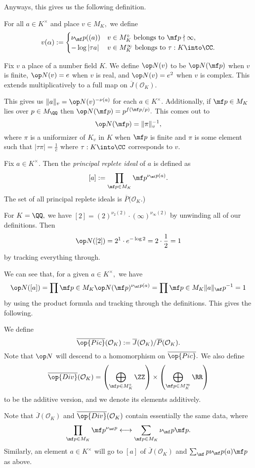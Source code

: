 Anyways, this gives us the following definition.
\begin{definition}
	For all $a\in K^\times$ and place $v\in M_K,$ we define
	\[v(\alpha):=\begin{cases}
		\nu_\mf p((a)) & v\in M_K^\circ\text{ belongs to }\mf p\nmid\infty, \\
		-\log|\tau a| & v\in M_K^\infty\text{ belongs to }\tau:K\into\CC.
	\end{cases}\]
\end{definition}
\begin{definition}
	Fix $v$ a place of a number field $K.$ We define $\op N(v)$ to be $\op N(\mf p)$ when $v$ is finite, $\op N(v)=e$ when $v$ is real, and $\op N(v)=e^2$ when $v$ is complex. This extends multiplicatively to a full map on $\overline J(\mathcal O_K).$
\end{definition}
This gives us $\lVert a\rVert_v=\op N(v)^{-\nu(a)}$ for each $a\in K^\times.$\todo{} Additionally, if $\mf p\in M_K$ lies over $p\in M_\QQ$ then $\op N(\mf p)=p^{f(\mf p/p)}.$ This comes out to
\[\op N(\mf p)=\lVert\pi\rVert_v^{-1},\]
where $\pi$ is a uniformizer of $K_v$ in $K$ when $\mf p$ is finite and $\pi$ is some element such that $|\tau\pi|=\frac1e$ where $\tau:K\into\CC$ corresponds to $v.$
\begin{definition}
	Fix $a\in K^\times.$ Then the \textit{principal replete ideal} of $a$ is defined as
	\[[a]:=\prod_{\mf p\in M_K}\mf p^{\nu_\mf p(a)}.\]
	The set of all principal replete ideals is $\overline P(\mathcal O_K.$)
\end{definition}
\begin{example}
	For $K=\QQ,$ we have $[2]=(2)^{\nu_2(2)}\cdot(\infty)^{\nu_\infty(2)}$ by unwinding all of our definitions. Then
	\[\op N([2])=2^1\cdot e^{-\log2}=2\cdot\frac12=1\]
	by tracking everything through.
\end{example}
We can see that, for a given $a\in K^\times,$ we have
\[\op N([a])=\prod{\mf p\in M_K}\op N(\mf p)^{\nu_\mf p(a)}=\prod{\mf p\in M_K}\lVert a\rVert_\mf p^{-1}=1\]
by using the product formula and tracking through the definitions. This gives the following.
\begin{definition}
	We define
	\[\overline{\op{Pic}}(\mathcal O_K):=\overline J(\mathcal O_K)/\overline P(\mathcal O_K).\]
	Note that $\op N$ will descend to a homomorphism on $\overline{\op{Pic}}.$ We also define
	\[\overline{\op{Div}}(\mathcal O_K)=\left(\bigoplus_{\mf p\in M_K^\circ}\ZZ\right)\times\left(\bigoplus_{\mf p\in M_K^\infty}\RR\right)\]
	to be the additive version, and we denote its elements additively.
\end{definition}
Note that $\overline{J}(\mathcal O_K)$ and $\overline{\op{Div}}(\mathcal O_K)$ contain essentially the same data, where
\[\prod_{\mf p\in M_K}\mf p^{\nu_\mf p}\longleftrightarrow\sum_{\mf p\in M_K}\nu_\mf p\mf p.\]
Similarly, an element $a\in K^\times$ will go to $[a]$ of $\overline J(\mathcal O_K)$ and $\sum_\mf p\nu_\mf p(a)\mf p$ as above.

